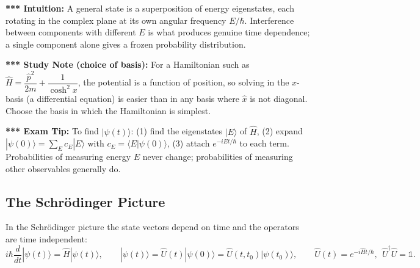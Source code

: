 \documentclass[11pt,a4paper]{article}
\begin{document}
\textbf{*** Intuition:} A general state is a superposition of energy eigenstates, each rotating in the complex plane at its own angular frequency $E/\hbar$. Interference between components with different $E$ is what produces genuine time dependence; a single component alone gives a frozen probability distribution.

\textbf{*** Study Note (choice of basis):} For a Hamiltonian such as $\hat H=\dfrac{\hat p^2}{2m}+\dfrac1{\cosh^2x}$, the potential is a function of position, so solving in the $x$-basis (a differential equation) is easier than in any basis where $\hat x$ is not diagonal. Choose the basis in which the Hamiltonian is simplest.

\textbf{*** Exam Tip:} To find $|\psi(t)\rangle$: (1) find the eigenstates $|E\rangle$ of $\hat H$, (2) expand $|\psi(0)\rangle=\sum_Ec_E|E\rangle$ with $c_E=\langle E|\psi(0)\rangle$, (3) attach $e^{-iEt/\hbar}$ to each term. Probabilities of measuring energy $E$ never change; probabilities of measuring other observables generally do.

\subsection{The Schr\"odinger Picture}
In the Schr\"odinger picture the state vectors depend on time and the operators are time independent:
\[
i\hbar\frac d{dt}|\psi(t)\rangle=\hat H|\psi(t)\rangle,\qquad |\psi(t)\rangle=\hat U(t)|\psi(0)\rangle=\hat U(t,t_0)|\psi(t_0)\rangle,\qquad \hat U(t)=e^{-i\hat Ht/\hbar},\ \ \hat U^\dagger\hat U=\mathbb 1 .
\]
\end{document}
